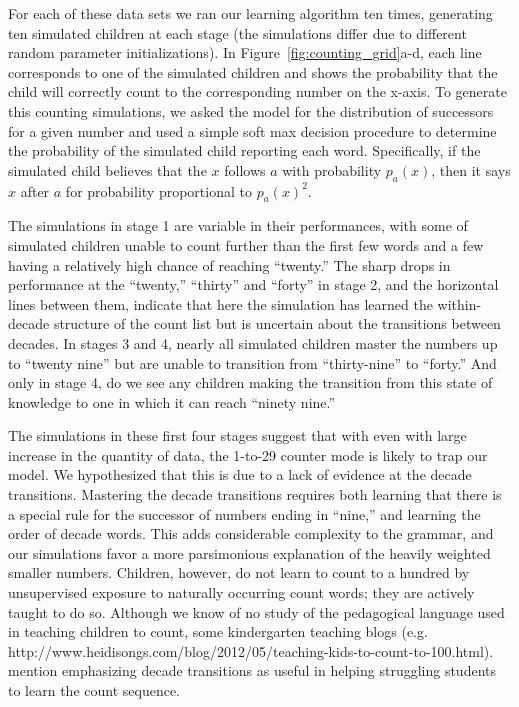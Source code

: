 \documentclass[10pt,letterpaper]{article}
\begin{document}
For each of these data sets we ran our learning algorithm ten times,
generating ten simulated children at each stage (the simulations
differ due to different random parameter initializations). In
Figure~\ref{fig:counting_grid}a-d, each line corresponds to one of the
simulated children and shows the probability that the child will
correctly count to the corresponding number on the x-axis. To generate
this counting simulations, we asked the model for the distribution of
successors for a given number and used a simple soft max decision
procedure to determine the probability of the simulated child
reporting each word. Specifically, if the simulated child believes
that the $x$ follows $a$ with probability $p_a(x)$, then it says $x$
after $a$ for probability proportional to $p_a(x)^2 $.

The simulations in stage 1 are variable in their performances, with
some of simulated children unable to count further than the first few
words and a few having a relatively high chance of reaching
``twenty.'' The sharp drops in performance at the ``twenty,'' ``thirty''
and ``forty'' in stage 2, and the horizontal lines between them,
indicate that here the simulation has learned the within-decade
structure of the count list but is uncertain about the transitions
between decades. In stages 3 and 4, nearly all simulated children
master the numbers up to ``twenty nine'' but are unable to transition from
``thirty-nine'' to ``forty.'' And only in stage 4, do we see any
children making the transition from this state of knowledge to one in
which it can reach ``ninety nine.'' 

The simulations in these first four stages suggest that with even with
large increase in the quantity of data, the 1-to-29 counter mode is
likely to trap our model. We hypothesized that this is due to a lack
of evidence at the decade transitions. Mastering the decade
transitions requires both learning that there is a special rule for
the successor of numbers ending in ``nine,'' and learning the order of
decade words. This adds considerable complexity to the grammar, and
our simulations favor a more parsimonious explanation of the heavily
weighted smaller numbers. Children, however, do not learn to count to
a hundred by unsupervised exposure to naturally occurring count words;
they are actively taught to do so. Although we know of no study of the
pedagogical language used in teaching children to count, some kindergarten teaching
blogs (e.g. http://www.heidisongs.com/blog/2012/05/teaching-kids-to-count-to-100.html).
mention emphasizing decade transitions as useful in helping struggling
students to learn the count sequence.
\end{document}
